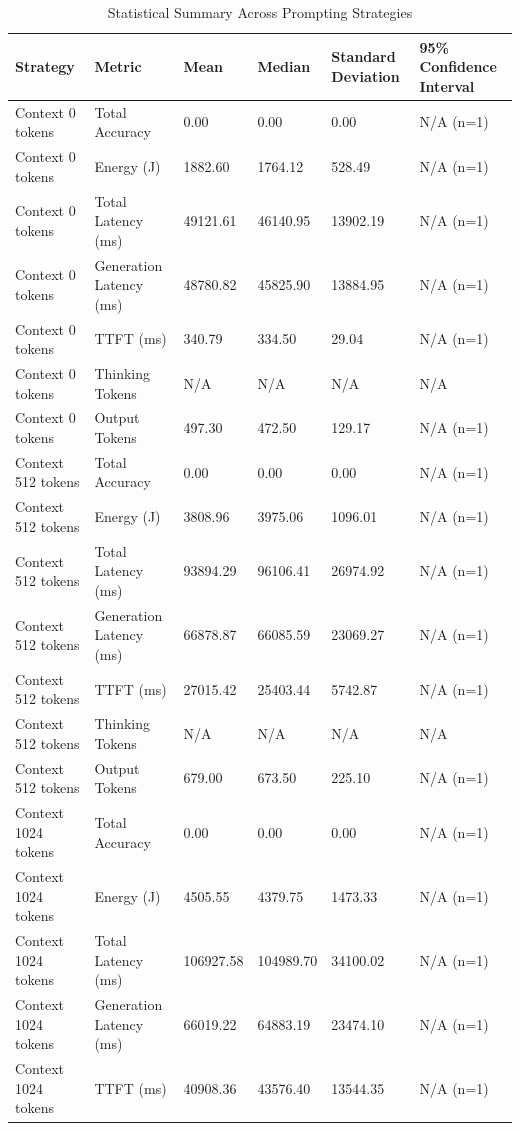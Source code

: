 \begin{table}
\caption{Statistical Summary Across Prompting Strategies}
\label{tab:statistical_summary}
\begin{tabular}{llllll}
\toprule
Strategy & Metric & Mean & Median & Standard Deviation & 95\% Confidence Interval \\
\midrule
Context 0 tokens & Total Accuracy & 0.00 & 0.00 & 0.00 & N/A (n=1) \\
Context 0 tokens & Energy (J) & 1882.60 & 1764.12 & 528.49 & N/A (n=1) \\
Context 0 tokens & Total Latency (ms) & 49121.61 & 46140.95 & 13902.19 & N/A (n=1) \\
Context 0 tokens & Generation Latency (ms) & 48780.82 & 45825.90 & 13884.95 & N/A (n=1) \\
Context 0 tokens & TTFT (ms) & 340.79 & 334.50 & 29.04 & N/A (n=1) \\
Context 0 tokens & Thinking Tokens & N/A & N/A & N/A & N/A \\
Context 0 tokens & Output Tokens & 497.30 & 472.50 & 129.17 & N/A (n=1) \\
Context 512 tokens & Total Accuracy & 0.00 & 0.00 & 0.00 & N/A (n=1) \\
Context 512 tokens & Energy (J) & 3808.96 & 3975.06 & 1096.01 & N/A (n=1) \\
Context 512 tokens & Total Latency (ms) & 93894.29 & 96106.41 & 26974.92 & N/A (n=1) \\
Context 512 tokens & Generation Latency (ms) & 66878.87 & 66085.59 & 23069.27 & N/A (n=1) \\
Context 512 tokens & TTFT (ms) & 27015.42 & 25403.44 & 5742.87 & N/A (n=1) \\
Context 512 tokens & Thinking Tokens & N/A & N/A & N/A & N/A \\
Context 512 tokens & Output Tokens & 679.00 & 673.50 & 225.10 & N/A (n=1) \\
Context 1024 tokens & Total Accuracy & 0.00 & 0.00 & 0.00 & N/A (n=1) \\
Context 1024 tokens & Energy (J) & 4505.55 & 4379.75 & 1473.33 & N/A (n=1) \\
Context 1024 tokens & Total Latency (ms) & 106927.58 & 104989.70 & 34100.02 & N/A (n=1) \\
Context 1024 tokens & Generation Latency (ms) & 66019.22 & 64883.19 & 23474.10 & N/A (n=1) \\
Context 1024 tokens & TTFT (ms) & 40908.36 & 43576.40 & 13544.35 & N/A (n=1) \\

\end{tabular}
\end{table}
